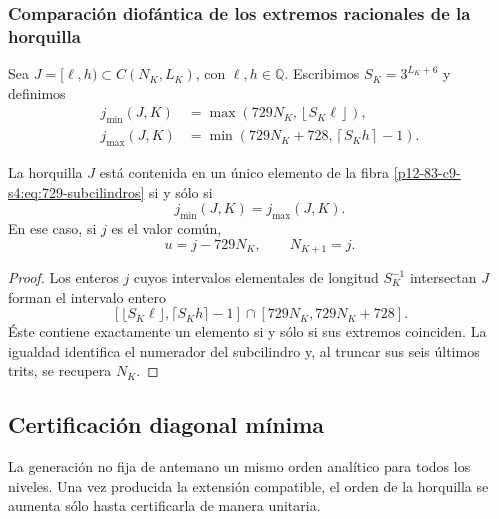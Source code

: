 \subsubsection{Comparación diofántica de los extremos racionales de la horquilla}

Sea \(J=[\ell,h)\subset C(N_K,L_K)\), con
\(\ell,h\in\mathbb Q\). Escribimos \(S_K=3^{L_K+6}\) y definimos
\begin{align}
 j_{\min}(J,K)
 &=\max\!\left(729N_K,\left\lfloor S_K\ell\right\rfloor\right),
 \label{p12-83-c9-s4:eq:jmin-diagonal}\\
 j_{\max}(J,K)
 &=\min\!\left(729N_K+728,\left\lceil S_Kh\right\rceil-1\right).
 \label{p12-83-c9-s4:eq:jmax-diagonal}
\end{align}

\begin{lemma}
\label{p12-83-c9-s4:lem:criterio-localizacion-unitaria}
La horquilla \(J\) está contenida en un único elemento de la fibra
\eqref{p12-83-c9-s4:eq:729-subcilindros} si y sólo si
\begin{equation}
 \boxed{j_{\min}(J,K)=j_{\max}(J,K).}
 \label{p12-83-c9-s4:eq:jmin-igual-jmax}
\end{equation}
En ese caso, si \(j\) es el valor común,
\[
 u=j-729N_K,
 \qquad
 N_{K+1}=j.
\]
\end{lemma}

\begin{proof}
Los enteros \(j\) cuyos intervalos elementales de longitud \(S_K^{-1}\)
intersectan \(J\) forman el intervalo entero
\[
 \left[
 \lfloor S_K\ell\rfloor,
 \lceil S_Kh\rceil-1
 \right]\cap
 [729N_K,729N_K+728].
\]
Éste contiene exactamente un elemento si y sólo si sus extremos coinciden.
La igualdad identifica el numerador del subcilindro y, al truncar sus seis
últimos trits, se recupera \(N_K\).
\end{proof}

\subsection{Certificación diagonal mínima}

La generación no fija de antemano un mismo orden analítico para todos los
niveles. Una vez producida la extensión compatible, el orden de la
horquilla se aumenta sólo hasta certificarla de manera unitaria.

